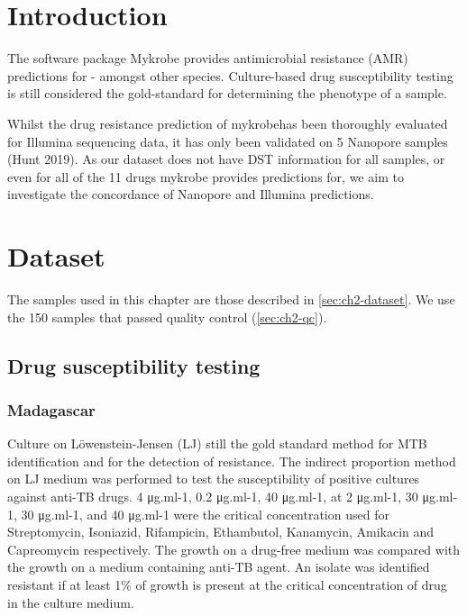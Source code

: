 \section{Introduction}

The software package Mykrobe provides antimicrobial resistance (AMR) predictions for \mtb{} - amongst other species. 
Culture-based drug susceptibility testing is still considered the gold-standard for determining the phenotype of a sample.

Whilst the drug resistance prediction of mykrobehas been thoroughly evaluated for Illumina sequencing data, it has only been validated on 5 Nanopore samples (Hunt 2019). As our dataset does not have DST information for all samples, or even for all of the 11 drugs mykrobe provides predictions for, we aim to investigate the concordance of Nanopore and Illumina predictions. 

\section{Dataset}
The \mtb{} samples used in this chapter are those described in \autoref{sec:ch2-dataset}. We use the 150 samples that passed quality control (\autoref{sec:ch2-qc}).

\subsection{Drug susceptibility testing}
\label{sec:dst-methods}

\subsubsection{Madagascar}
Culture on Löwenstein-Jensen (LJ) still the gold standard method for MTB identification and for the detection of resistance. The indirect proportion method on LJ medium was performed to test the susceptibility of positive cultures against anti-TB drugs. 4 μg.ml-1, 0.2 μg.ml-1, 40 μg.ml-1, at 2 μg.ml-1, 30 μg.ml-1, 30 μg.ml-1, and 40 μg.ml-1 were the critical concentration used for Streptomycin, Isoniazid, Rifampicin, Ethambutol, Kanamycin, Amikacin and Capreomycin respectively. The growth on a drug-free medium was compared with the growth on a medium containing anti-TB agent. An isolate was identified resistant if at least 1\% of growth is present at the critical concentration of drug in the culture medium. 

